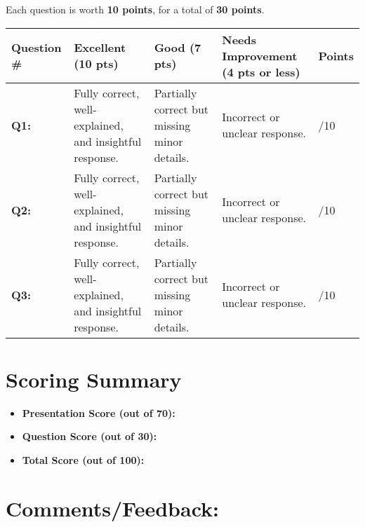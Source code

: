 \documentclass{article}
\begin{document}
Each question is worth \textbf{10 points}, for a total of \textbf{30 points}.  

\begin{tabular}{|p{4cm}|p{3cm}|p{3cm}|p{3cm}|p{2cm}|}
    \hline
    \textbf{Question \#} & \textbf{Excellent (10 pts)} & \textbf{Good (7 pts)} & \textbf{Needs Improvement (4 pts or less)} & \textbf{Points} \\
    \hline
    \textbf{Q1:} & Fully correct, well-explained, and insightful response. & Partially correct but missing minor details. & Incorrect or unclear response. & \hspace{1cm} /10 \\
    \hline
    \textbf{Q2:} & Fully correct, well-explained, and insightful response. & Partially correct but missing minor details. & Incorrect or unclear response. & \hspace{1cm} /10 \\
    \hline
    \textbf{Q3:} & Fully correct, well-explained, and insightful response. & Partially correct but missing minor details. & Incorrect or unclear response. & \hspace{1cm} /10 \\
    \hline
\end{tabular}

\section*{Scoring Summary}
\begin{itemize}
    \item \textbf{Presentation Score (out of 70):} \underline{\hspace{2cm}}
    \item \textbf{Question Score (out of 30):} \underline{\hspace{2cm}}
    \item \textbf{Total Score (out of 100):} \underline{\hspace{2cm}}
\end{itemize}

\section*{Comments/Feedback:}
\underline{\hspace{15cm}} \\
\underline{\hspace{15cm}} \\
\underline{\hspace{15cm}}
\end{document}
